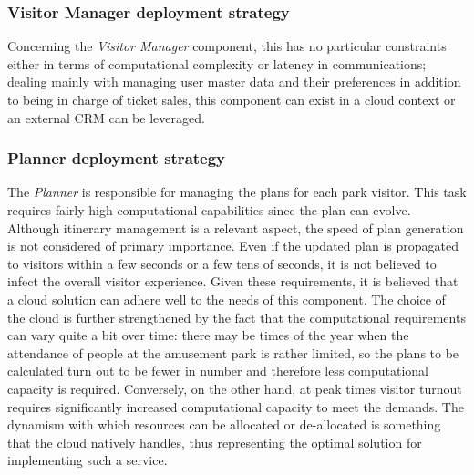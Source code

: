 \subsubsection{Visitor Manager deployment strategy}
Concerning the \textit{Visitor Manager} component, this has no particular constraints either in terms of computational complexity or latency in
communications; dealing mainly with managing user master data and their preferences in addition to being in charge of ticket sales, this component
can exist in a cloud context or an external CRM can be leveraged.

\subsubsection{Planner deployment strategy}
The \textit{Planner} is responsible for managing the plans for each park visitor. This task requires fairly high computational capabilities since the
plan can evolve. Although itinerary management is a relevant aspect, the speed of plan generation is not considered of primary importance. Even if
the updated plan is propagated to visitors within a few seconds or a few tens of seconds, it is not believed to infect the overall visitor
experience. Given these requirements, it is believed that a cloud solution can adhere well to the needs of this component. The choice of the cloud is
further strengthened by the fact that the computational requirements can vary quite a bit over time: there may be times of the year when the
attendance of people at the amusement park is rather limited, so the plans to be calculated turn out to be fewer in number and therefore less
computational capacity is required. Conversely, on the other hand, at peak times visitor turnout requires significantly increased computational
capacity to meet the demands. The dynamism with which resources can be allocated or de-allocated is something that the cloud natively handles, thus
representing the optimal solution for implementing such a service.

